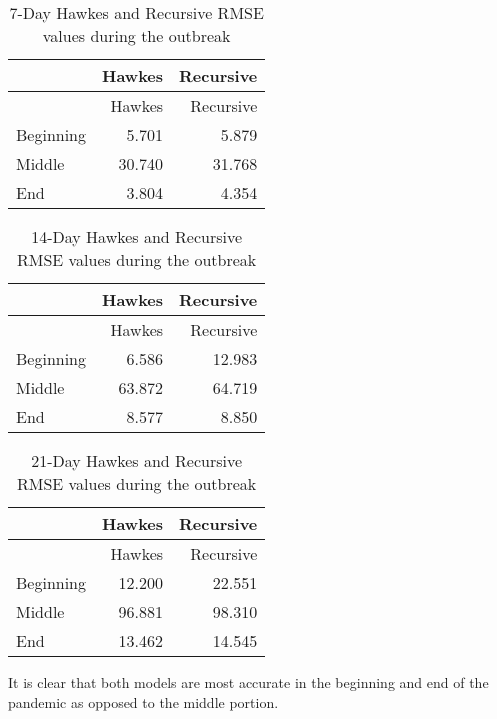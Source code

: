 \documentclass[
]{article}
\begin{document}
\begin{longtable}[]{@{}lrr@{}}
\caption{7-Day Hawkes and Recursive RMSE values during the
outbreak}\tabularnewline
\toprule
& Hawkes & Recursive\tabularnewline
\midrule
\endfirsthead
\toprule
& Hawkes & Recursive\tabularnewline
\midrule
\endhead
Beginning & 5.701 & 5.879\tabularnewline
Middle & 30.740 & 31.768\tabularnewline
End & 3.804 & 4.354\tabularnewline
\bottomrule
\end{longtable}

\begin{longtable}[]{@{}lrr@{}}
\caption{14-Day Hawkes and Recursive RMSE values during the
outbreak}\tabularnewline
\toprule
& Hawkes & Recursive\tabularnewline
\midrule
\endfirsthead
\toprule
& Hawkes & Recursive\tabularnewline
\midrule
\endhead
Beginning & 6.586 & 12.983\tabularnewline
Middle & 63.872 & 64.719\tabularnewline
End & 8.577 & 8.850\tabularnewline
\bottomrule
\end{longtable}

\begin{longtable}[]{@{}lrr@{}}
\caption{21-Day Hawkes and Recursive RMSE values during the
outbreak}\tabularnewline
\toprule
& Hawkes & Recursive\tabularnewline
\midrule
\endfirsthead
\toprule
& Hawkes & Recursive\tabularnewline
\midrule
\endhead
Beginning & 12.200 & 22.551\tabularnewline
Middle & 96.881 & 98.310\tabularnewline
End & 13.462 & 14.545\tabularnewline
\bottomrule
\end{longtable}

It is clear that both models are most accurate in the beginning and end
of the pandemic as opposed to the middle portion.
\end{document}
